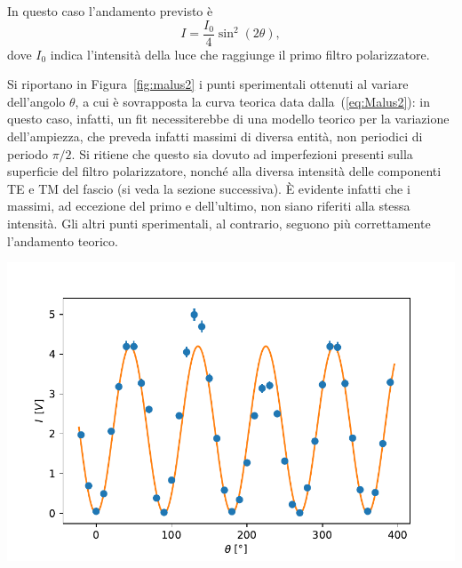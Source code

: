 \documentclass[10pt,oneside,a4paper]{article}
\newenvironment{Figure}
  {\par\medskip\noindent\minipage{\linewidth}}
  {\endminipage\par\medskip}
\begin{document}
\begin{multicols}{2}
In questo caso l'andamento previsto è
\begin{equation}\label{eq:Malus2}
I = \frac{I_0}{4}\sin^2(2\theta),
\end{equation}
dove $I_0$ indica l'intensità della luce che raggiunge il primo filtro polarizzatore.

Si riportano in Figura~\ref{fig:malus2} i punti sperimentali ottenuti al variare dell'angolo $\theta$, a cui è sovrapposta la curva teorica data dalla~(\ref{eq:Malus2}): in questo caso, infatti, un fit necessiterebbe di una modello teorico per la variazione dell'ampiezza, che preveda infatti massimi di diversa entità, non periodici di periodo $\pi / 2$. Si ritiene che questo sia dovuto ad imperfezioni presenti sulla superficie del filtro polarizzatore, nonché alla diversa intensità delle componenti TE e TM del fascio (si veda la sezione successiva). È evidente infatti che i massimi, ad eccezione del primo e dell'ultimo, non siano riferiti alla stessa intensità. Gli altri punti sperimentali, al contrario, seguono più correttamente l'andamento teorico.

\begin{Figure}
	\begin{center}
	\includegraphics[width=\linewidth]{malus2.pdf}
	\label{fig:malus2}
	\end{center}
\end{Figure}


\end{multicols}
\end{document}
